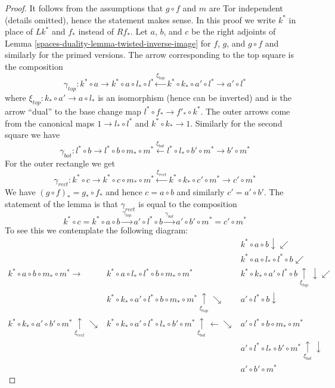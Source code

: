 \begin{proof}
It follows from the assumptions that $g \circ f$ and $m$ are Tor
independent (details omitted), hence the statement makes sense.
In this proof we write $k^*$ in place of $Lk^*$ and $f_*$ instead
of $Rf_*$. Let $a$, $b$, and $c$ be the right adjoints of
Lemma \ref{spaces-duality-lemma-twisted-inverse-image}
for $f$, $g$, and $g \circ f$ and similarly for the primed versions.
The arrow corresponding to the top square is the composition
$$
\gamma_{top} :
k^* \circ a \to k^* \circ a \circ l_* \circ l^*
\xleftarrow{\xi_{top}} k^* \circ k_* \circ a' \circ l^* \to a' \circ l^*
$$
where $\xi_{top} : k_* \circ a' \to a \circ l_*$
is an isomorphism (hence can be inverted)
and is the arrow ``dual'' to the base change map
$l^* \circ f_* \to f'_* \circ k^*$. The outer arrows come
from the canonical maps $1 \to l_* \circ l^*$ and $k^* \circ k_* \to 1$.
Similarly for the second square we have
$$
\gamma_{bot} :
l^* \circ b \to l^* \circ b \circ m_* \circ m^*
\xleftarrow{\xi_{bot}} l^* \circ l_* \circ b' \circ m^* \to b' \circ m^*
$$
For the outer rectangle we get
$$
\gamma_{rect} :
k^* \circ c \to k^* \circ c \circ m_* \circ m^*
\xleftarrow{\xi_{rect}} k^* \circ k_* \circ c' \circ m^* \to c' \circ m^*
$$
We have $(g \circ f)_* = g_* \circ f_*$ and hence
$c = a \circ b$ and similarly $c' = a' \circ b'$.
The statement of the lemma is that $\gamma_{rect}$
is equal to the composition
$$
k^* \circ c = k^* \circ a \circ b \xrightarrow{\gamma_{top}}
a' \circ l^* \circ b \xrightarrow{\gamma_{bot}}
a' \circ b' \circ m^* = c' \circ m^*
$$
To see this we contemplate the following diagram:
$$
\begin{array}{ccc} &  & k^* \circ a \circ b \downarrow\swarrow \\  &  & k^* \circ a \circ l_* \circ l^* \circ b \swarrow \\ k^* \circ a \circ b \circ m_* \circ m^* \longrightarrow & k^* \circ a \circ l_* \circ l^* \circ b \circ m_* \circ m^* & k^* \circ k_* \circ a' \circ l^* \circ b \underset{\xi_{top}}{\uparrow}\downarrow\swarrow \\  & k^*\circ k_* \circ a' \circ l^* \circ b \circ m_* \circ m^*
\underset{\xi_{top}}{\uparrow}\searrow & a' \circ l^* \circ b \downarrow \\ k^* \circ k_* \circ a' \circ b' \circ m^* \underset{\xi_{rect}}{\uparrow}\searrow & k^*\circ k_* \circ a' \circ l^* \circ l_* \circ b' \circ m^*
\underset{\xi_{bot}}{\uparrow}\longleftarrow\searrow & a' \circ l^* \circ b \circ m_* \circ m^* \\  &  & a' \circ l^* \circ l_* \circ b' \circ m^* \underset{\xi_{bot}}{\uparrow}\downarrow \\  &  & a' \circ b' \circ m^*\end{array}
$$
\end{proof}

